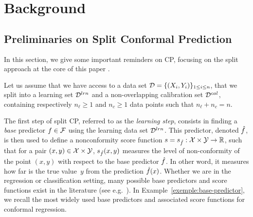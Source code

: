 
\section{Background}

\subsection{Preliminaries on Split Conformal Prediction}

\label{sec:conform-background}

In this section, we give some important reminders on CP, focusing on the split approach at the core of this paper \citep{papadopoulos2002inductive}. 


Let us assume that we have access to a 
data set ${\cal D}=\{(X_i,Y_i)\}_{1 \leq i \leq n}$, that we split into 
a learning set ${\cal D}^{lrn}$ and a non-overlapping calibration set 
${\cal D}^{cal}$, 
containing respectively $n_\ell\geq 1$ and $n_c \geq 1$ data points such that $n_\ell+n_c=n$.%

The first step of split CP, referred to as the \textit{learning step}, consists in finding a \textit{base} predictor $f\in\mathcal{F}$ using the learning data set ${\cal D}^{lrn}$. This predictor, denoted $\hat{f}$, is then used to define a nonconformity score function 
$s = s_{\hat{f}}: {\cal X} \times {\cal Y} \rightarrow {\mathbb{R}}$, 
such that for a pair $(x,y) \in {\cal X} \times {\cal Y}$, 
$s_{\hat{f}}(x,y)$ measures the level of non-conformity of the point $(x,y)$ with respect to the base predictor $\hat{f}$. In other word, it measures how far is the true value~$y$ from the prediction $\hat{f}(x)$. Whether we are in the regression or classification setting, many possible base predictors and score functions exist in the literature (see e.g.~\cite{angelopoulos2023conformal}). In Example~\ref{exemple:base-predictor}, we recall the most widely used base predictors and associated score functions for conformal regression.

